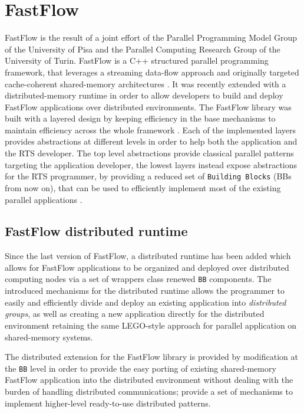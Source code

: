 \chapter{FastFlow}
\label{chap:fastflow}
FastFlow is the result of a joint effort of the Parallel Programming Model Group of the University of Pisa and the Parallel Computing Research Group of the University of Turin. FastFlow is a C++ structured parallel programming framework, that leverages a streaming data-flow approach and originally targeted cache-coherent shared-memory architectures \cite{fastflow}. It was recently extended with a distributed-memory runtime in order to allow developers to build and deploy FastFlow applications over distributed environments. The FastFlow library was built with a layered design by keeping efficiency in the base mechanisms to maintain efficiency across the whole framework \cite{fastflow-highlevel}. Each of the implemented layers provides abstractions at different levels in order to help both the application and the RTS developer. The top level abstractions provide classical parallel patterns targeting the application developer, the lowest layers instead expose abstractions for the RTS programmer, by providing a reduced set of \texttt{Building Blocks} (BBs from now on), that can be used to efficiently implement most of the existing parallel applications \cite{fastflow-highlevel}.
\section{FastFlow distributed runtime}
Since the last version of FastFlow, a distributed runtime has been added which allows for FastFlow applications to be organized and deployed over distributed computing nodes via a set of wrappers class renewed \texttt{BB} components. The introduced mechanisms for the distributed runtime allows the programmer to easily and efficiently divide and deploy an existing application into \textit{distributed groups}, as well as creating a new application directly for the distributed environment retaining the same LEGO-style approach for parallel application on shared-memory systems.\newline

The distributed extension for the FastFlow library is provided by modification at the \texttt{BB} level in order to provide the easy porting of existing shared-memory FastFlow application into the distributed environment without dealing with the burden of handling distributed communications; provide a set of mechanisms to implement higher-level ready-to-use distributed patterns.
